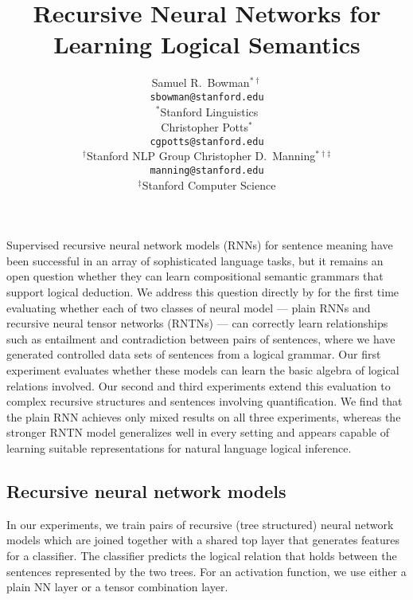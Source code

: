 \documentclass{article} %
\title{Recursive Neural Networks for Learning Logical Semantics}
\author{
Samuel R.\ Bowman$^{\ast\dag}$ \\
\texttt{sbowman@stanford.edu} \\[2ex]
$^{\ast}$Stanford Linguistics \\
\And
Christopher Potts$^{\ast}$\\
\texttt{cgpotts@stanford.edu} \\[2ex]
$^{\dag}$Stanford NLP Group
\And
Christopher D.\ Manning$^{\ast\dag\ddag}$\\
\texttt{manning@stanford.edu}\\[2ex]
$^{\ddag}$Stanford Computer Science
}
\def\ii#1{\textit{#1}}
\begin{document}
\maketitle


  Supervised recursive neural network models (RNNs) for sentence
  meaning have been successful in an array of sophisticated language
  tasks, but it remains an open question whether they can learn
  compositional semantic grammars that support logical deduction.  We
  address this question directly by for the first time evaluating
  whether each of two classes of neural model --- plain RNNs and
  recursive neural tensor networks (RNTNs) --- can correctly learn
  relationships such as entailment and contradiction between pairs of
  sentences, where we have generated controlled data sets of sentences
  from a logical grammar.  Our first experiment evaluates whether
  these models can learn the basic algebra of logical relations
  involved. Our second and third experiments extend this evaluation to
  complex recursive structures and sentences involving quantification.
  We find that the plain RNN achieves only mixed results on all three
  experiments, whereas the stronger RNTN model generalizes well in
  every setting and appears capable of learning suitable
  representations for natural language logical inference.

\subsection*{Recursive neural network models}

\begin{figure}[hp]
  \centering\resizebox{4.5in}{!}{
  }
  \label{sample-figure}
\end{figure}

In our experiments, we train pairs of recursive (tree structured) neural network models \cite{socher2013acl1} which are joined together with a shared top layer that generates features for a classifier. The classifier predicts the logical relation that holds between the sentences represented by the two trees. For an activation function, we use either a plain NN layer or a tensor combination layer.

\end{document}
